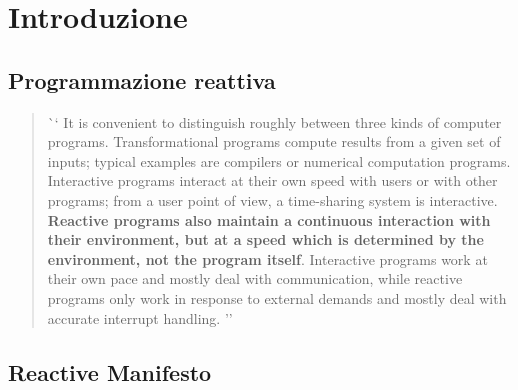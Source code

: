     \begin{frame}[c]
        \titlepage
    \end{frame}

    \section{Introduzione}\label{sec:intro}

        \subsection{Programmazione reattiva}\label{subsec:react}

        \begin{frame}{\insertsectionhead}
            \begin{block}{\insertsubsectionhead}
                \smallskip
                \begin{quote}
                    \foreignlanguage{english}
                    `` It is convenient to distinguish roughly between three kinds of computer programs.
                    Transformational programs compute results from a given set of inputs;
                    typical examples are compilers or numerical computation programs.
                    Interactive programs interact at their own speed with users or with other programs;
                    from a user point of view, a time-sharing system is interactive.
                    \textbf{Reactive programs also maintain a continuous interaction with their environment, but at a speed which is determined by the environment, not the program itself}.
                    Interactive programs work at their own pace and mostly deal with communication, while reactive programs only work in response to external demands and mostly deal with accurate interrupt handling. ''
                \end{quote}
            \end{block}
        \end{frame}

        \subsection{Reactive Manifesto}\label{subsec:manifest}


